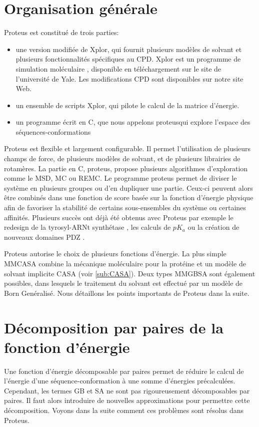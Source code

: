\section{Organisation générale}

Proteus est constitué de trois parties:
\begin{itemize}
\item une version modifiée de Xplor, qui fournit plusieurs modèles de solvant et plusieurs fonctionnalités spécifiques au CPD. Xplor est un programme de simulation moléculaire \cite{Xplor}, disponible en téléchargement sur le site de l'université de Yale. Les modifications CPD sont disponibles sur notre site Web. 
\item un ensemble de scripts Xplor, qui pilote le calcul de la matrice d'énergie. 
\item un programme écrit en C, que nous appelons \og proteus\fg qui explore l'espace des séquences-conformations
\end{itemize}
Proteus est flexible et largement configurable. Il permet l'utilisation de plusieurs champs de force, de plusieurs modèles de solvant, et de plusieurs librairies de rotamères. La partie en C, proteus, propose plusieurs algorithmes d'exploration comme le MSD, MC ou REMC. Le programme proteus permet de diviser le système en plusieurs groupes ou d'en dupliquer une partie. Ceux-ci peuvent alors être combinés dans une fonction de score basée sur la fonction d'énergie physique afin de favoriser la stabilité de certains sous-ensembles du système ou certaines affinités. Plusieurs succès ont déjà été obtenus avec Proteus par exemple le redesign de la tyrosyl-ARNt synthétase \cite{Simonson16}, les calculs de $pK_a$ \cite{Villa17} ou la création de nouveaux domaines PDZ \cite{Mignon17}.

Proteus autorise le choix de plusieurs fonctions d'énergie. La plus simple \og MMCASA \fg combine la mécanique moléculaire pour la protéine et un modèle de solvant implicite CASA (voir  \vref{sub:CASA}). Deux types \og MMGBSA \fg sont également possibles, dans lesquels le traitement du solvant est effectué par un modèle de Born Genéralisé. Nous détaillons les points importants de Proteus dans la suite.

\section{Décomposition par paires de la fonction d'énergie}
Une fonction d'énergie décomposable par paires permet de réduire le calcul de l'énergie d'une séquence-conformation à une somme d'énergies précalculées. Cependant, les termes GB et SA ne sont pas rigoureusement décomposables par paires. Il faut alors introduire de nouvelles approximations pour permettre cette décomposition. Voyons dans la suite comment ces problèmes sont résolus dans Proteus.
